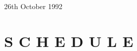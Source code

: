 \documentclass[12pt,a4paper]{article}
\begin{document}
26th October 1992

\clearpage

\small

\part[Schedule]{S C H E D U L E}

%

%
%
%
%
%
%
%
\end{document}
